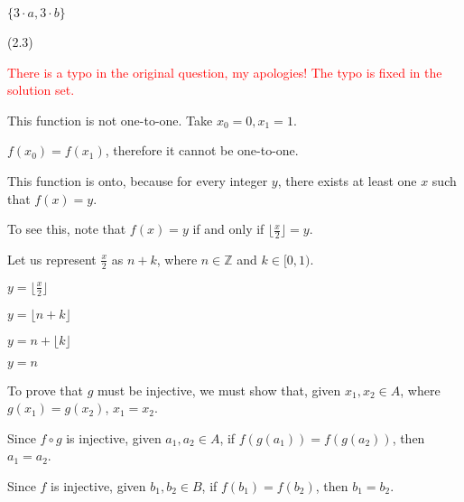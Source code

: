 \documentclass{exam}
\begin{document}
\begin{questions}
\begin{subparts}

\begin{center}
\( \{3 \cdot a, 3 \cdot b\} \)
\end{center}

\end{subparts}

 (2.3)

\begin{center}

\textcolor{red}{There is a typo in the original question, my apologies! The typo is fixed in the solution set.}

This function is not one-to-one. Take \(x_0 = 0, x_1 = 1\). 

\(f(x_0) = f(x_1)\), therefore it cannot be one-to-one.
\vspace{5px}

This function is onto, because for every integer \(y\), there exists at least one \(x\) such that \(f(x) = y\). 

To see this, note that \(f(x) = y\) if and only if \(\lfloor \frac{x}{2} \rfloor = y\).

Let us represent \(\frac{x}{2}\) as \(n + k\), where \(n \in \mathbb{Z}\) and \(k \in [0,1)\). 

\( y = \lfloor \frac{x}{2} \rfloor \)

\( y = \lfloor n + k \rfloor \)

\( y = n + \lfloor k \rfloor \)

\( y = n \)

\end{center}

\newpage

\begin{subparts}

\begin{center}

To prove that \(g\) must be injective, we must show that, given \(x_1, x_2 \in A\), where \(g(x_1) = g(x_2)\), \(x_1 = x_2\).

Since \(f \circ g\) is injective, given \(a_1, a_2 \in A\), if \(f(g(a_1)) = f(g(a_2))\), then \(a_1 = a_2\).

Since \(f\) is injective, given \(b_1, b_2 \in B\), if \(f(b_1) = f(b_2)\), then \(b_1 = b_2\).


\end{center}
\end{subparts}
\end{questions}
\end{document}
